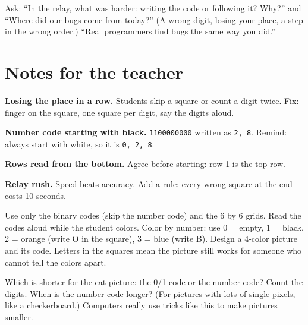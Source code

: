 \begin{reflection}
Ask: \enquote{In the relay, what was harder: writing the code or following it? Why?} and \enquote{Where did our bugs come from today?} (A wrong digit, losing your place, a step in the wrong order.) \enquote{Real programmers find bugs the same way you did.}
\end{reflection}

\section{Notes for the teacher}
\begin{commonmistakes}
  \item \textbf{Losing the place in a row.} Students skip a square or count a digit twice. Fix: finger on the square, one square per digit, say the digits aloud.
  \item \textbf{Number code starting with black.} \texttt{1100000000} written as \texttt{2, 8}. Remind: always start with white, so it is \texttt{0, 2, 8}.
  \item \textbf{Rows read from the bottom.} Agree before starting: row 1 is the top row.
  \item \textbf{Relay rush.} Speed beats accuracy. Add a rule: every wrong square at the end costs 10 seconds.
\end{commonmistakes}

\begin{differentiation}
\supportpath Use only the binary codes (skip the number code) and the 6 by 6 grids. Read the codes aloud while the student colors.
\extensionpath Color by number: use 0 = empty, 1 = black, 2 = orange (write O in the square), 3 = blue (write B). Design a 4-color picture and its code. Letters in the squares mean the picture still works for someone who cannot tell the colors apart.
\end{differentiation}

\begin{stretchchallenge}
Which is shorter for the cat picture: the 0/1 code or the number code? Count the digits. When is the number code longer? (For pictures with lots of single pixels, like a checkerboard.) Computers really use tricks like this to make pictures smaller.
\end{stretchchallenge}

